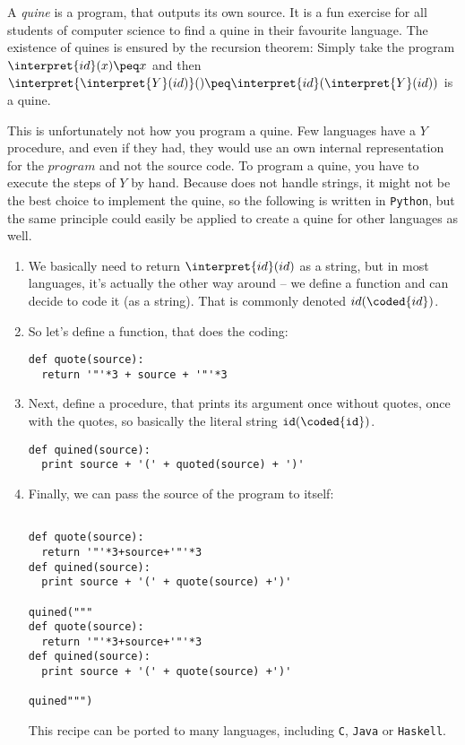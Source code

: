 \begin{example}[Quines]
	A {\em quine}\/ is a program, that outputs its own source. It is a fun 
	exercise for all students of computer science to find a quine in their 
	favourite language. The existence of quines is ensured by the recursion theorem:
	Simply take the program $\interpret{id}(x)\peq x$ and then 
	$\interpret{\interpret{Y}(id)}() \peq \interpret{id}(\interpret{Y}(id))$ 
	is a quine.

	This is unfortunately not how you program a quine. Few languages have a $Y$ 
	procedure, and even if they had, they would use an own internal 
	representation for the $program$ and not the source code. To program 
	a quine, you have to execute the steps of $Y$ by hand. Because \WHILE does 
	not handle strings, it might not be the best choice to implement the quine, 
	so the following is written in {\tt Python}, but the same principle could 
	easily be applied to create a quine for other languages as well.

	\begin{enumerate}
		\item We basically need to return $\interpret{id}(id)$ as a string, but 
			in most languages, it's actually the other way around -- we define a 
			function and can decide to code it (as a string). That is commonly 
			denoted $id(\coded{id})$.
		\item So let's define a function, that does the coding:
\begin{verbatim}
def quote(source):
  return '"'*3 + source + '"'*3
\end{verbatim}
		\item Next, define a procedure, that prints its argument once without 
			quotes, once with the quotes, so basically the literal string ${\tt id(\coded{id})}$.
\begin{verbatim}
def quined(source):
  print source + '(' + quoted(source) + ')'
\end{verbatim}
		\item Finally, we can pass the source of the program to itself:
\begin{verbatim}

def quote(source):
  return '"'*3+source+'"'*3
def quined(source):
  print source + '(' + quote(source) +')'

quined("""
def quote(source):
  return '"'*3+source+'"'*3
def quined(source):
  print source + '(' + quote(source) +')'

quined""")
\end{verbatim}
		This recipe can be ported to many languages, including {\tt C}, {\tt Java} or {\tt Haskell}.
	\end{enumerate}
\end{example}

